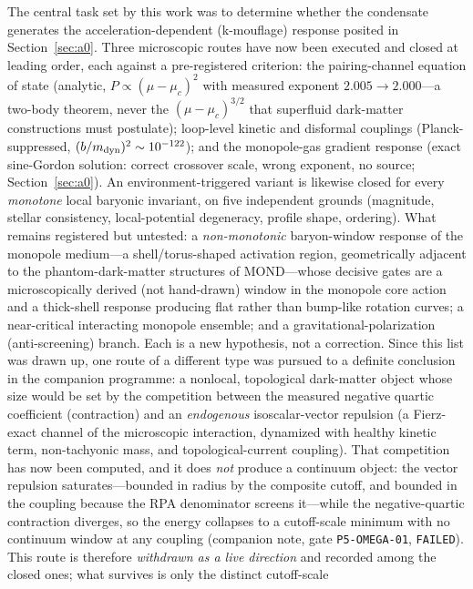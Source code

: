 \documentclass[11pt,a4paper]{article}
\begin{document}
The central task set by this work was to determine whether the
condensate generates the acceleration-dependent (k-mouflage)
response posited in Section~\ref{sec:a0}.  Three microscopic routes
have now been executed and closed at leading order, each against a
pre-registered criterion: the pairing-channel equation of state
(analytic, $P \propto (\mu-\mu_c)^2$ with measured exponent
$2.005 \to 2.000$---a two-body theorem, never the
$(\mu-\mu_c)^{3/2}$ that superfluid dark-matter constructions
\cite{Berezhiani:2015bqa} must postulate); loop-level kinetic and
disformal couplings (Planck-suppressed,
$(b/m_{\rm dyn})^2 \sim 10^{-122}$); and the monopole-gas gradient
response (exact sine-Gordon solution: correct crossover scale,
wrong exponent, no source; Section~\ref{sec:a0}).  An
environment-triggered variant is likewise closed for every
\emph{monotone} local baryonic invariant, on five independent
grounds (magnitude, stellar consistency, local-potential degeneracy,
profile shape, ordering).  What remains registered but untested:
a \emph{non-monotonic} baryon-window response of the monopole
medium---a shell/torus-shaped activation region, geometrically
adjacent to the phantom-dark-matter structures of MOND---whose
decisive gates are a microscopically derived (not hand-drawn) window
in the monopole core action and a thick-shell response producing
flat rather than bump-like rotation curves; a near-critical
interacting monopole ensemble; and a gravitational-polarization
(anti-screening) branch.  Each is a new hypothesis, not a
correction.  Since this list was drawn up, one route of a different
type was pursued to a definite conclusion in the companion
programme: a nonlocal, topological dark-matter object whose size
would be set by the competition between the measured negative
quartic coefficient (contraction) and an \emph{endogenous}
isoscalar-vector repulsion (a Fierz-exact channel of the
microscopic interaction, dynamized with healthy kinetic term,
non-tachyonic mass, and topological-current coupling).  That
competition has now been computed, and it does \emph{not} produce a
continuum object: the vector repulsion saturates---bounded in
radius by the composite cutoff, and bounded in the coupling because
the RPA denominator screens it---while the negative-quartic
contraction diverges, so the energy collapses to a cutoff-scale
minimum with no continuum window at any coupling (companion note,
gate \texttt{P5-OMEGA-01}, \texttt{FAILED}).  This route is
therefore \emph{withdrawn as a live direction} and recorded among
the closed ones; what survives is only the distinct cutoff-scale
\end{document}
